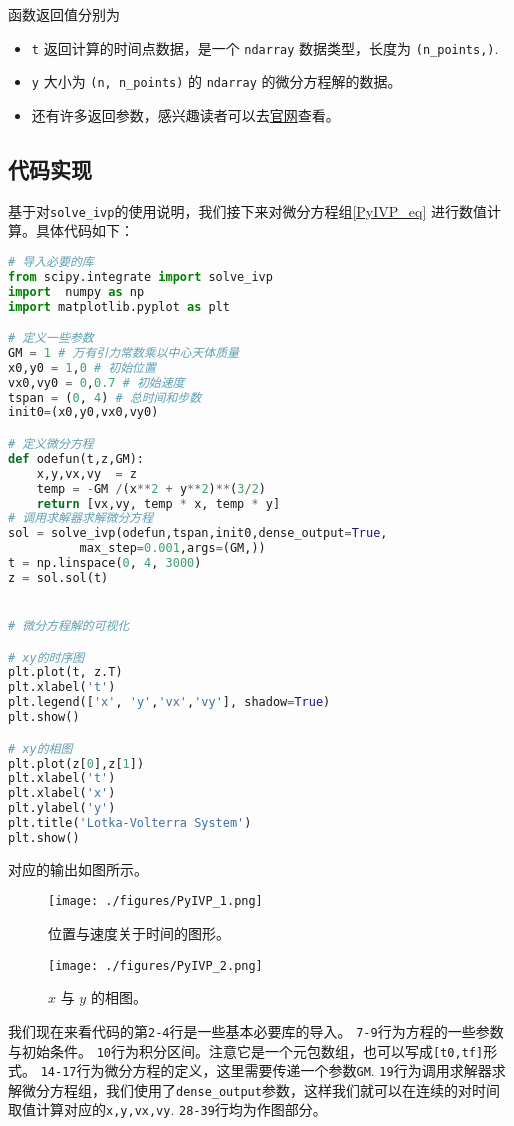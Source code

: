 函数返回值分别为
\begin{itemize}
\item  \verb|t| 返回计算的时间点数据，是一个 \verb|ndarray| 数据类型，长度为 \verb|(n_points,)|.
\item \verb|y| 大小为 \verb|(n, n_points)| 的 \verb|ndarray| 的微分方程解的数据。
\item 还有许多返回参数，感兴趣读者可以去\href{https://scipy.github.io/devdocs/reference/generated/scipy.integrate.solve_ivp.html#r179348322575-7}{官网}查看。
\end{itemize}


\subsection{代码实现}
基于对\verb|solve_ivp|的使用说明，我们接下来对微分方程组\ref{PyIVP_eq} 进行数值计算。具体代码如下：
\begin{lstlisting}[language=python]
# 导入必要的库
from scipy.integrate import solve_ivp
import  numpy as np
import matplotlib.pyplot as plt

# 定义一些参数
GM = 1 # 万有引力常数乘以中心天体质量
x0,y0 = 1,0 # 初始位置
vx0,vy0 = 0,0.7 # 初始速度
tspan = (0, 4) # 总时间和步数
init0=(x0,y0,vx0,vy0)

# 定义微分方程
def odefun(t,z,GM):
    x,y,vx,vy  = z
    temp = -GM /(x**2 + y**2)**(3/2)
    return [vx,vy, temp * x, temp * y]
# 调用求解器求解微分方程
sol = solve_ivp(odefun,tspan,init0,dense_output=True,
          max_step=0.001,args=(GM,))
t = np.linspace(0, 4, 3000)
z = sol.sol(t)


# 微分方程解的可视化

# xy的时序图
plt.plot(t, z.T)
plt.xlabel('t')
plt.legend(['x', 'y','vx','vy'], shadow=True)
plt.show()

# xy的相图
plt.plot(z[0],z[1])
plt.xlabel('t')
plt.xlabel('x')
plt.ylabel('y')
plt.title('Lotka-Volterra System')
plt.show()
\end{lstlisting}

对应的输出如图所示。
\begin{figure}[ht]
\centering
\texttt{[image: ./figures/PyIVP\_1.png]}
\caption{位置与速度关于时间的图形。} \label{PyIVP_fig1}
\end{figure}

\begin{figure}[ht]
\centering
\texttt{[image: ./figures/PyIVP\_2.png]}
\caption{$x$ 与 $y$ 的相图。} \label{PyIVP_fig2}
\end{figure}

我们现在来看代码的第\verb|2-4|行是一些基本必要库的导入。 
\verb|7-9|行为方程的一些参数与初始条件。
\verb|10|行为积分区间。注意它是一个元包数组，也可以写成\verb|[t0,tf]|形式。
\verb|14-17|行为微分方程的定义，这里需要传递一个参数\verb|GM|.
\verb|19|行为调用求解器求解微分方程组，我们使用了\verb|dense_output|参数，这样我们就可以在连续的对时间取值计算对应的\verb|x,y,vx,vy|. 
\verb|28-39|行均为作图部分。
